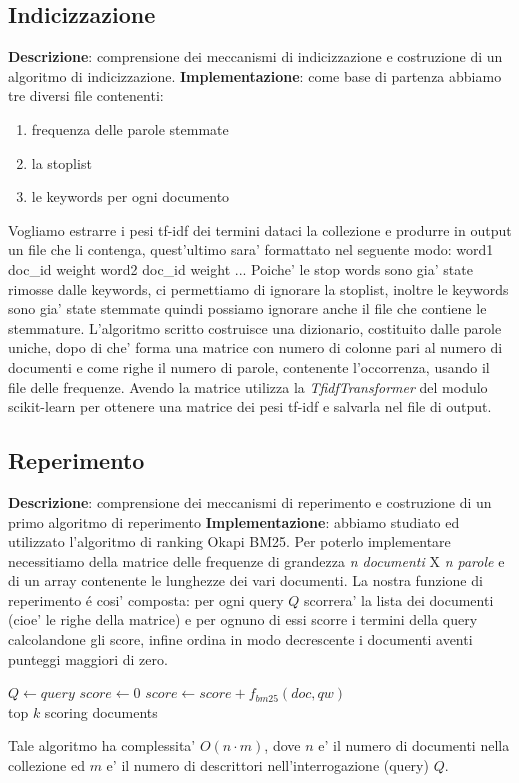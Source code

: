 \subsection{Indicizzazione} \label{sec:metodi-di-indic}

\textbf{Descrizione}: comprensione dei meccanismi di indicizzazione e costruzione di un algoritmo di indicizzazione.
\textbf{Implementazione}: come base di partenza abbiamo tre diversi file contenenti: \begin{enumerate}\item frequenza delle parole stemmate
 \item la stoplist 
 \item le keywords per ogni documento
  \end{enumerate}
Vogliamo estrarre i pesi tf-idf dei termini dataci la collezione e produrre in output un file che li contenga, quest'ultimo sara' formattato nel seguente modo: 
word1  doc\_id  weight
word2  doc\_id  weight
...
Poiche' le stop words sono gia' state rimosse dalle keywords, ci permettiamo di ignorare la stoplist, inoltre le keywords sono gia' state stemmate quindi possiamo ignorare anche il file che contiene le stemmature.
L'algoritmo scritto costruisce una dizionario, costituito dalle parole uniche, dopo di che' forma una matrice con numero di colonne pari al numero di documenti e come righe il numero di parole, contenente l'occorrenza, usando il file delle frequenze. Avendo la matrice utilizza la \textit{TfidfTransformer} del modulo scikit-learn per ottenere una matrice dei pesi tf-idf e salvarla nel file di output.

\subsection{Reperimento}
\label{sec:metodi-di-reper}

\textbf{Descrizione}: comprensione dei meccanismi di reperimento e costruzione di un primo algoritmo di reperimento
\textbf{Implementazione}: abbiamo studiato ed utilizzato l'algoritmo di ranking Okapi BM25. Per poterlo implementare necessitiamo della matrice delle frequenze di grandezza \textit{n documenti} X \textit{n parole} e di un array contenente le lunghezze dei vari documenti.
La nostra funzione di reperimento \'e cosi' composta: per ogni query $Q$ scorrera' la lista dei documenti (cioe' le righe della matrice) e per ognuno di essi scorre i termini della query calcolandone gli score, infine ordina in modo decrescente i documenti aventi punteggi maggiori di zero.
\begin{algorithmic}
\State $Q \gets query$
    \State $score\gets 0$
        \State $score \gets score + f_{bm25}(doc, qw)$
    \EndFor
\EndFor\\
\Return top $k$ scoring documents
\end{algorithmic}
Tale algoritmo ha complessita' $O(n \cdot m)$, dove $n$ e' il numero di documenti nella collezione ed $m$ e' il numero di descrittori nell'interrogazione (query) $Q$.


